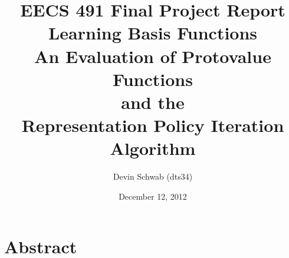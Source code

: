\documentclass[10pt, letterpaper, final]{report}
\author{Devin Schwab (dts34)}
\title{EECS 491 Final Project Report\\
Learning Basis Functions\\
 An Evaluation of Protovalue Functions\\
 and the\\
 Representation Policy Iteration Algorithm}
\date{December 12, 2012}
\begin{document}
\maketitle

\tableofcontents
\newpage

\section{Abstract}
\end{document}
